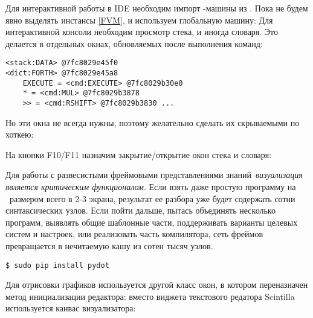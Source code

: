\clearpage\noindent
Для интерактивной работы в IDE необходим импорт \F-машины из \metal.  
Пока не будем явно выделять инстансы  \ref{FVM}, и используем
глобальную машину:
\noindent
Для интерактивной консоли необходим просмотр стека, и иногда словаря. Это
делается в отдельных окнах, обновляемых после выполнения команд:
\begin{verbatim}
<stack:DATA> @7fc8029e45f0
<dict:FORTH> @7fc8029e45a8
    EXECUTE = <cmd:EXECUTE> @7fc8029b30e0
    * = <cmd:MUL> @7fc8029b3878
    >> = <cmd:RSHIFT> @7fc8029b3830 ...
\end{verbatim}

Но эти окна не всегда нужны, поэтому желательно сделать их скрываемыми по
хоткею:

\noindent
На кнопки F10/F11 назначим закрытие/открытие окон стека и словаря:


\clearpage
{}

Для работы с развесистыми фреймовыми представлениями знаний\ \emph{визуализация является
критическим функционалом}. Если взять даже простую программу на \emc\ размером
всего в 2-3 экрана, результат ее разбора уже будет содержать сотни
синтаксических узлов. Если пойти дальше, пытась объединять несколько программ,
выявлять общие шаблонные части, поддерживать варианты целевых систем и настроек,
или реализовать часть компилятора, сеть фреймов превращается в нечитаемую кашу
из сотен тысяч узлов.

\begin{verbatim}
$ sudo pip install pydot
\end{verbatim}

Для отрисовки графиков используется другой класс окон, в котором переназначен
метод инициализации редактора: вместо виджета текстового редатора Scintilla
используется канвас визуализатора:

{}

\secup

\secup